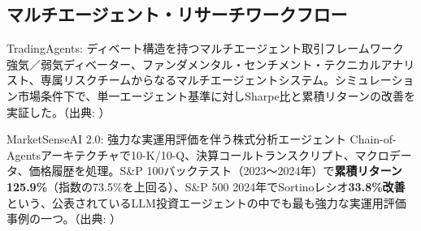 \subsection{マルチエージェント・リサーチワークフロー}

\begin{casestudy}{TradingAgents: ディベート構造を持つマルチエージェント取引フレームワーク}
強気／弱気ディベーター、ファンダメンタル・センチメント・テクニカルアナリスト、専属リスクチームからなるマルチエージェントシステム。シミュレーション市場条件下で、単一エージェント基準に対しSharpe比と累積リターンの改善を実証した。（出典: \cite{tradingagents2024}）
\end{casestudy}

\begin{casestudy}{MarketSenseAI 2.0: 強力な実運用評価を伴う株式分析エージェント}
Chain-of-Agentsアーキテクチャで10-K/10-Q、決算コールトランスクリプト、マクロデータ、価格履歴を処理。S\&P 100バックテスト（2023〜2024年）で\textbf{累積リターン125.9\%}（指数の73.5\%を上回る）、S\&P 500 2024年でSortinoレシオ\textbf{33.8\%改善}という、公表されているLLM投資エージェントの中でも最も強力な実運用評価事例の一つ。（出典: \cite{marketsenseai2025}）
\end{casestudy}

